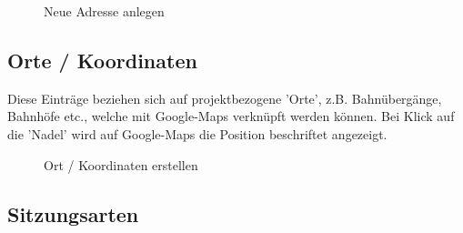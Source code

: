 \begin{figure}[H]
\caption{Neue Adresse anlegen}
\end{figure}

\subsection{Orte / Koordinaten}

Diese Einträge beziehen sich auf projektbezogene 'Orte', z.B. Bahnübergänge, Bahnhöfe etc., welche mit Google-Maps verknüpft werden können. Bei Klick auf die 'Nadel' wird auf Google-Maps die Position beschriftet angezeigt.

\begin{figure}[H]
\caption{Ort / Koordinaten erstellen}
\end{figure}

\clearpage
\subsection{Sitzungsarten}
\label{bkm:Ref20190508001}


